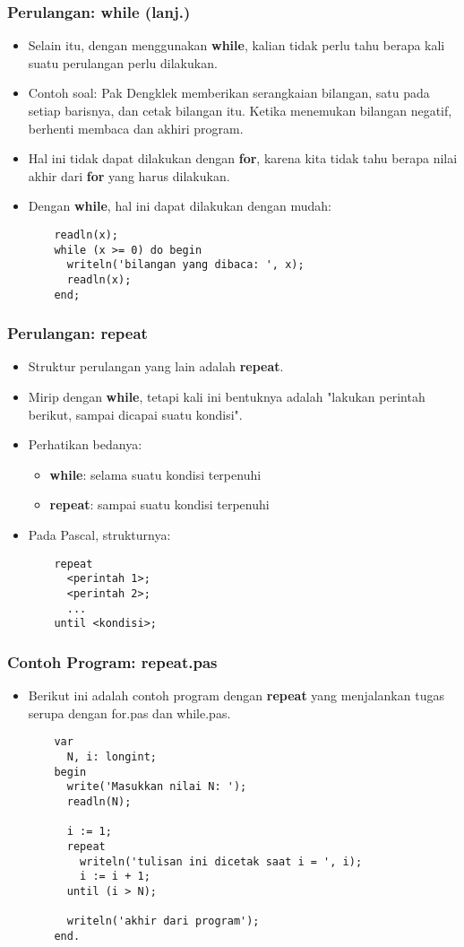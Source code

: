 \begin{frame}[fragile]
\frametitle{Perulangan: while (lanj.)}
\begin{itemize}
  \item Selain itu, dengan menggunakan \textbf{while}, kalian tidak perlu tahu berapa kali suatu perulangan perlu dilakukan.
  \item Contoh soal: Pak Dengklek memberikan serangkaian bilangan, satu pada setiap barisnya, dan cetak bilangan itu. Ketika menemukan bilangan negatif, berhenti membaca dan akhiri program.
  \item Hal ini tidak dapat dilakukan dengan \textbf{for}, karena kita tidak tahu berapa nilai akhir dari \textbf{for} yang harus dilakukan.
  \item Dengan \textbf{while}, hal ini dapat dilakukan dengan mudah:
  \begin{lstlisting}
    readln(x);
    while (x >= 0) do begin
      writeln('bilangan yang dibaca: ', x);
      readln(x);
    end;
  \end{lstlisting}
\end{itemize}
\end{frame}

\begin{frame}[fragile]
\frametitle{Perulangan: repeat}
\begin{itemize}
  \item Struktur perulangan yang lain adalah \textbf{repeat}.
  \item Mirip dengan \textbf{while}, tetapi kali ini bentuknya adalah "lakukan perintah berikut, sampai dicapai suatu kondisi".
  \item Perhatikan bedanya:
  \begin{itemize}
    \item \textbf{while}: selama suatu kondisi terpenuhi
    \item \textbf{repeat}: sampai suatu kondisi terpenuhi
  \end{itemize}
  \item Pada Pascal, strukturnya:
  \begin{lstlisting}
    repeat
      <perintah 1>;
      <perintah 2>;
      ...
    until <kondisi>;
  \end{lstlisting}
\end{itemize}
\end{frame}

\begin{frame}[fragile]
\frametitle{Contoh Program: repeat.pas}
\begin{itemize}
  \item Berikut ini adalah contoh program dengan \textbf{repeat} yang menjalankan tugas serupa dengan for.pas dan while.pas.
  \begin{lstlisting}
    var
      N, i: longint;
    begin
      write('Masukkan nilai N: ');
      readln(N);

      i := 1;
      repeat
        writeln('tulisan ini dicetak saat i = ', i);
        i := i + 1;
      until (i > N);

      writeln('akhir dari program');
    end.
  \end{lstlisting}
\end{itemize}
\end{frame}

